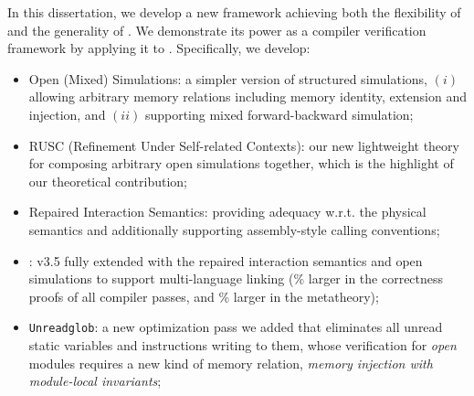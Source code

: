 %
In this dissertation, we develop a new framework achieving both the
flexibility of \ccx{} and the generality of \ccc{}.  We demonstrate
its power as a compiler verification framework by applying it to \cc{}.
Specifically, we develop:
\begin{itemize}
\item Open (Mixed) Simulations: a simpler version of structured simulations,
  $(i)$ allowing arbitrary memory relations including memory identity, extension and injection,
  and $(ii)$ supporting mixed forward-backward simulation;
\item RUSC (Refinement Under Self-related Contexts): our new
  lightweight theory for composing arbitrary open simulations
  together, which is the highlight of our theoretical contribution;
\item Repaired Interaction Semantics: providing adequacy w.r.t. the
  physical semantics and additionally supporting assembly-style
  calling conventions;
\item \ccm{}: \cc{} v3.5 fully extended with
  the repaired interaction semantics and open simulations to support
  multi-language linking (\% larger in the correctness
  proofs of all compiler passes, and \% larger in the metatheory);
\item \texttt{Unreadglob}:
  a new optimization pass we added that eliminates all unread static
  variables and instructions writing to them,
  whose verification for \emph{open} modules requires
  a new kind of memory relation, \emph{memory injection with module-local
  invariants};
\end{itemize}
\medskip


